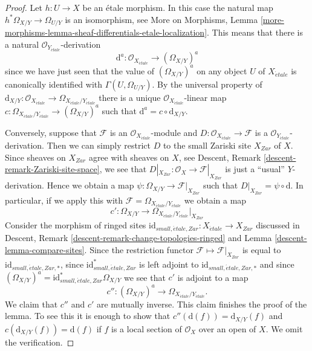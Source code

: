 \documentclass[10pt,a4paper]{amsart}
\theoremstyle{plain}
\theoremstyle{definition}
\theoremstyle{remark}
\numberwithin{equation}{subsection}
\def\etale{{\acute{e}tale}}
\begin{document}
\begin{proof}
Let $h : U \to X$ be an \'etale morphism. In this case the natural map
$h^*\Omega_{X/Y} \to \Omega_{U/Y}$ is an isomorphism, see
More on Morphisms,
Lemma \ref{more-morphisms-lemma-sheaf-differentials-etale-localization}.
This means that there is a natural $\mathcal{O}_{Y_\etale}$-derivation
$$
\text{d}^a : \mathcal{O}_{X_\etale} \longrightarrow (\Omega_{X/Y})^a
$$
since we have just seen that the value of $(\Omega_{X/Y})^a$ on any object
$U$ of $X_\etale$ is canonically identified with
$\Gamma(U, \Omega_{U/Y})$. By the universal property of
$\text{d}_{X/Y} :
\mathcal{O}_{X_\etale}
\to
\Omega_{X_\etale/Y_\etale}$
there is a unique $\mathcal{O}_{X_\etale}$-linear map
$c : \Omega_{X_\etale/Y_\etale} \to (\Omega_{X/Y})^a$
such that
$\text{d}^a = c \circ \text{d}_{X/Y}$.

\medskip\noindent
Conversely, suppose that $\mathcal{F}$ is an
$\mathcal{O}_{X_\etale}$-module
and $D : \mathcal{O}_{X_\etale} \to \mathcal{F}$ is a
$\mathcal{O}_{Y_\etale}$-derivation. Then we can simply restrict
$D$ to the small Zariski site $X_{Zar}$ of $X$. Since sheaves on $X_{Zar}$
agree with sheaves on $X$, see
Descent, Remark \ref{descent-remark-Zariski-site-space},
we see that $D|_{X_{Zar}} : \mathcal{O}_X \to \mathcal{F}|_{X_{Zar}}$
is just a ``usual'' $Y$-derivation. Hence we obtain a map
$\psi : \Omega_{X/Y} \longrightarrow \mathcal{F}|_{X_{Zar}}$
such that $D|_{X_{Zar}} = \psi \circ \text{d}$. In particular, if we
apply this with $\mathcal{F} = \Omega_{X_\etale/Y_\etale}$
we obtain a map
$$
c' :
\Omega_{X/Y}
\longrightarrow
\Omega_{X_\etale/Y_\etale}|_{X_{Zar}}
$$
Consider the morphism of ringed sites
$\text{id}_{small, \etale, Zar} : X_\etale \to X_{Zar}$
discussed in
Descent, Remark \ref{descent-remark-change-topologies-ringed} and
Lemma \ref{descent-lemma-compare-sites}.
Since the restriction functor $\mathcal{F} \mapsto \mathcal{F}|_{X_{Zar}}$
is equal to $\text{id}_{small, \etale, Zar, *}$, since
$\text{id}_{small, \etale, Zar}^*$ is left adjoint to
$\text{id}_{small, \etale, Zar, *}$ and since
$(\Omega_{X/Y})^a = \text{id}_{small, \etale, Zar}^*\Omega_{X/Y}$
we see that $c'$ is adjoint to a map
$$
c'' :
(\Omega_{X/Y})^a
\longrightarrow
\Omega_{X_\etale/Y_\etale}.
$$
We claim that $c''$ and $c'$ are mutually inverse.
This claim finishes the proof of the lemma.
To see this it is enough to show that $c''(\text{d}(f)) = \text{d}_{X/Y}(f)$
and $c(\text{d}_{X/Y}(f)) = \text{d}(f)$ if $f$ is a local section of
$\mathcal{O}_X$ over an open of $X$. We omit the verification.
\end{proof}
\end{document}
